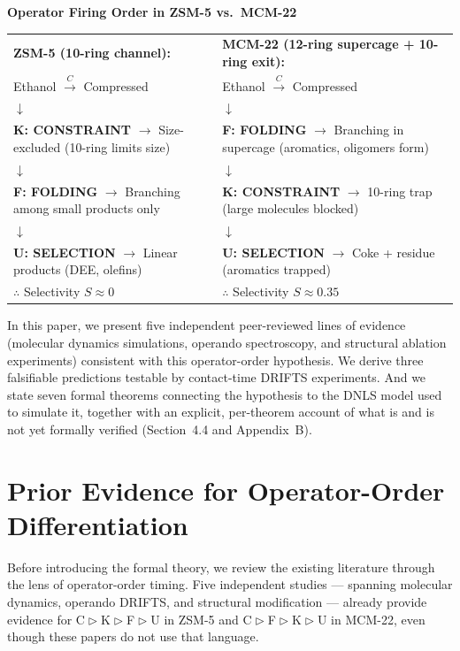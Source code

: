 \documentclass[11pt]{article}
\newcommand{\comp}{\mathrel{\triangleright}} %
\begin{document}
\bigskip
\noindent\textbf{Operator Firing Order in ZSM-5 vs.\ MCM-22}
\begin{center}
\begin{tabular}{p{} p{}}
\textbf{ZSM-5 (10-ring channel):} & \textbf{MCM-22 (12-ring supercage + 10-ring exit):} \\[4pt]
Ethanol $\xrightarrow{C}$ Compressed & Ethanol $\xrightarrow{C}$ Compressed \\[2pt]
$\downarrow$ & $\downarrow$ \\
\textbf{K: CONSTRAINT} $\to$ Size-excluded (10-ring limits size) & \textbf{F: FOLDING} $\to$ Branching in supercage (aromatics, oligomers form) \\
$\downarrow$ & $\downarrow$ \\
\textbf{F: FOLDING} $\to$ Branching among small products only & \textbf{K: CONSTRAINT} $\to$ 10-ring trap (large molecules blocked) \\
$\downarrow$ & $\downarrow$ \\
\textbf{U: SELECTION} $\to$ Linear products (DEE, olefins) & \textbf{U: SELECTION} $\to$ Coke + residue (aromatics trapped) \\[4pt]
$\therefore$ Selectivity $S \approx 0$ & $\therefore$ Selectivity $S \approx 0.35$
\end{tabular}
\end{center}
\bigskip

In this paper, we present five independent peer-reviewed lines of evidence (molecular dynamics simulations, operando spectroscopy, and structural ablation experiments) consistent with this operator-order hypothesis. We derive three falsifiable predictions testable by contact-time DRIFTS experiments. And we state seven formal theorems connecting the hypothesis to the DNLS model used to simulate it, together with an explicit, per-theorem account of what is and is not yet formally verified (Section~4.4 and Appendix~B).

\section{Prior Evidence for Operator-Order Differentiation}

Before introducing the formal theory, we review the existing literature through the lens of operator-order timing. Five independent studies --- spanning molecular dynamics, operando DRIFTS, and structural modification --- already provide evidence for C$\comp$K$\comp$F$\comp$U in ZSM-5 and C$\comp$F$\comp$K$\comp$U in MCM-22, even though these papers do not use that language.
\end{document}
